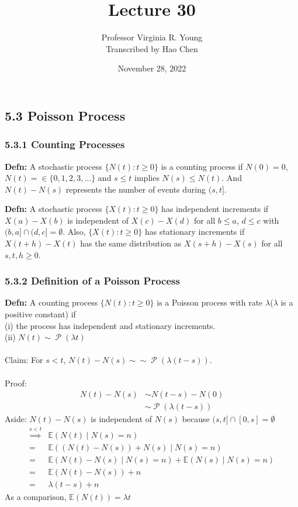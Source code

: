 \documentclass[a4paper]{article}
\title{Lecture 30}
\author{Professor Virginia R. Young\\ \small{Transcribed by Hao Chen}}
\date{November 28, 2022}
\newcommand{\n}{\hfill\break}
\newcommand{\defn}[1]{\par\noindent\settowidth{\hangindent}{\textbf{Defn: }}\textbf{Defn: }#1\n}
\newcommand{\Avg}{\mathbb{E}}
\newcommand{\E}{\Avg}
\DeclareMathOperator{\Poiss}{\mathcal{P}}
\begin{document}
\maketitle

\subsection*{5.3 Poisson Process}

\subsubsection*{5.3.1 Counting Processes}

\defn{
A stochastic process $\{N(t):t\geq0\}$ is a counting process if $N(0)=0$, $N(t)=\in\{0,1,2,3,\dots\}$ and $s\leq t$ implies $N(s)\leq N(t)$. And $N(t)-N(s)$ represents the number of events during $(s,t]$.
}

\defn{
A stochastic process $\{X(t):t\geq 0\}$ has independent increments if $X(a)-X(b)$ is independent of $X(c)-X(d)$ for all $b\leq a$, $d\leq c$ with $(b,a]\cap(d,c]=\emptyset$. Also,
$\{X(t):t\geq 0\}$ has stationary increments if $X(t+h)-X(t)$ has the same distribution as $X(s+h)-X(s)$ for all $s,t,h\geq 0$.
}

\subsubsection*{5.3.2 Definition of a Poisson Process}

\defn{
A counting process $\{N(t):t\geq 0\}$ is a Poisson process with rate $\lambda$($\lambda$ is a positive constant) if \\
(i) the process has independent and stationary increments.\\
(ii) $N(t)\sim\Poiss(\lambda t)$
\\\\
Claim: For $s<t$, $N(t)-N(s)\sim\sim\Poiss(\lambda(t-s))$.
\\\\
Proof: 
\begin{align*}
    N(t)-N(s)&\sim N(t-s)-N(0) \\
    &\sim\Poiss(\lambda(t-s))
\end{align*}
Aside: $N(t)-N(s)$ is independent of $N(s)$ because $(s,t]\cap[0,s]=\emptyset$
\begin{align*}
    \overset{s<t}{\implies}&\E(N(t)\mid N(s)=n) \\
    =&\E((N(t)-N(s))+N(s)\mid N(s)=n) \\
    =&\E(N(t)-N(s)\mid N(s)=n)+\E(N(s)\mid N(s)=n) \\
    =&\E(N(t)-N(s))+n \\
    =&\lambda(t-s)+n
\end{align*}
 As a comparison, $\E(N(t))=\lambda t$
}
\end{document}

